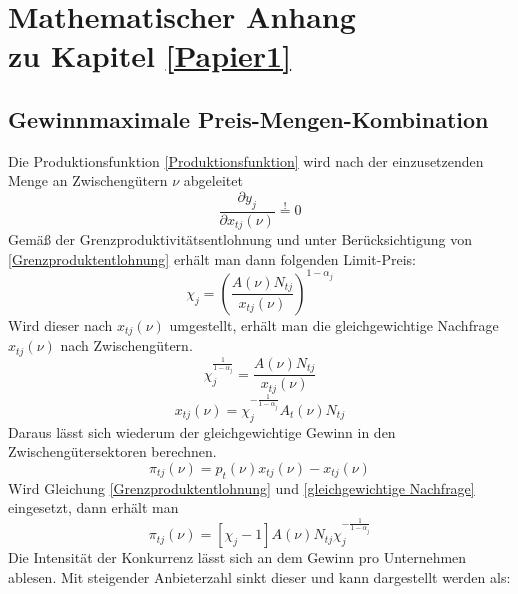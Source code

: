 \chapter[Mathematischer Anhang zu Kapitel \ref{Papier1}]{Mathematischer Anhang\\zu Kapitel \ref{Papier1}} 
\section[Gewinnmaximale Preis-Mengen-Kombination ]{Gewinnmaximale Preis-Mengen-Kombination }\label{sec:Appendix-Gewinn}

Die Produktionsfunktion \eqref{Produktionsfunktion} wird nach der einzusetzenden Menge an Zwischengütern $\nu$ abgeleitet
\begin{equation}
\frac{\partial y_j}{\partial x_{tj}(\nu)}\overset{!}{=}0
\end{equation} 
Gemä{\ss} der Grenzproduktivitätsentlohnung  und  unter Berücksichtigung von \eqref{Grenzproduktentlohnung} erhält man dann folgenden Limit-Preis:
\begin{equation}
\boxed{\chi_j=\left(\frac{A(\nu)N_{tj}}{x_{tj}(\nu)}\right)^{1-\alpha_j}}\label{LimitPreis}
\end{equation}
Wird dieser nach $x_{tj}(\nu)$ umgestellt, erhält man die gleichgewichtige Nachfrage $x_{tj}(\nu)$ nach Zwischengütern.
\begin{equation*}
\chi_j^{\frac{1}{1-\alpha_j}}=\frac{A(\nu)N_{tj}}{x_{tj}(\nu)}
\end{equation*}
\begin{equation}
x_{tj}(\nu)=\chi_j^{-\frac{1}{1-\alpha_j}}A_t(\nu)N_{tj}\label{gleichgewichtige Nachfrage}
\end{equation}
Daraus lässt sich wiederum der gleichgewichtige Gewinn in den Zwischengütersektoren berechnen.
\begin{equation*}
\pi_{tj}(\nu)=p_t(\nu)x_{tj}(\nu)-x_{tj}(\nu)
\end{equation*}
Wird Gleichung \eqref{Grenzproduktentlohnung} und \eqref{gleichgewichtige Nachfrage} eingesetzt, dann erhält man
\begin{equation}
\pi_{tj}(\nu)=[\chi_j-1]A(\nu)N_{tj}\chi_j^{-\frac{1}{1-\alpha_j}}
\end{equation}
Die Intensität der Konkurrenz lässt sich an dem Gewinn pro Unternehmen ablesen. Mit steigender Anbieterzahl sinkt dieser und kann dargestellt werden als:
